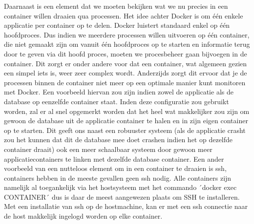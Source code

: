 Daarnaast is een element dat we moeten bekijken wat we nu precies in een container willen draaien qua processen. Het idee achter Docker is om één enkele applicatie per container op te delen. Docker luistert standaard enkel op één hoofdproces. Dus indien we meerdere processen willen uitvoeren op één container, die niet gemaakt zijn om vanuit één hoofdproces op te starten en informatie terug door te geven via dit hoofd proces, moeten we procesbeheer gaan bijvoegen in de container. Dit zorgt er onder andere voor dat een container, wat algemeen gezien een simpel iets is, weer zeer complex wordt. Anderzijds zorgt dit ervoor dat je de processen binnen de container niet meer op een optimale manier kunt monitoren met Docker. Een voorbeeld hiervan zou zijn indien zowel de applicatie als de database op eenzelfde container staat. Inden deze configuratie zou gebruikt worden, zal er al snel opgemerkt worden dat het heel wat makkelijker zou zijn om gewoon de database uit de applicatie container te halen en in zijn eigen container op te starten. Dit geeft ons naast een robuuster systeem (als de applicatie crasht zou het kunnen dat dit de database mee doet crashen indien het op dezelfde container draait) ook een meer schaalbaar systeem door gewoon meer applicatiecontainers te linken met dezelfde database container. Een ander voorbeeld van een nutteloos element om in een container te draaien is ssh, containers hebben in de meeste gevallen geen ssh nodig. Alle containers zijn namelijk al toegankelijk via het hostsysteem met het commando ´docker exec CONTAINER´ dus is daar de meest aangewezen plaats om SSH te installeren. Met een installatie van ssh op de hostmachine, kan er met een ssh connectie naar de host makkelijk ingelogd worden op elke container.
